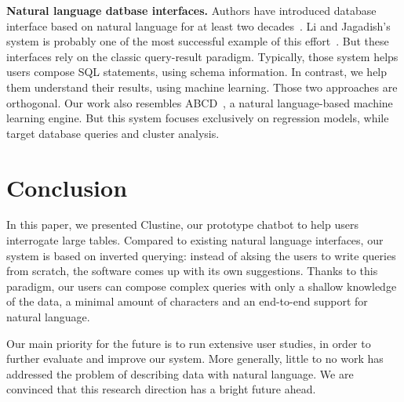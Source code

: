 \textbf{Natural language datbase interfaces.} Authors have introduced database
interface based on natural language for at least two
decades~\cite{androutsopoulos1995natural}. Li and Jagadish's system is
probably one of the most successful example of this
effort~\cite{li2014constructing}. But these interfaces rely on the classic
query-result paradigm.  Typically, those system helps users compose SQL
statements, using schema information. In contrast, we help them understand
their results, using machine learning. Those two approaches are orthogonal. Our
work also resembles ABCD~\cite{Lloyd2014ABCD}, a natural language-based
machine learning engine. But this system focuses exclusively on regression
models, while target database queries and cluster analysis.


\section{Conclusion}
\label{sec:conclusion} 
In this paper, we presented Clustine, our prototype chatbot to help users
interrogate large tables.  Compared to existing natural language interfaces,
our system is based on inverted querying: instead of aksing the users to write
queries from scratch, the software comes up with its own suggestions. Thanks to
this paradigm, our users can compose complex queries with only a shallow
knowledge of the data, a minimal amount of characters and an end-to-end support
for natural language.

Our main priority for the future is to run extensive
user studies, in order to further evaluate and improve our system. More
generally, little to no work has addressed the problem of describing data with
natural language. We are convinced that this research direction has a bright
future ahead.

